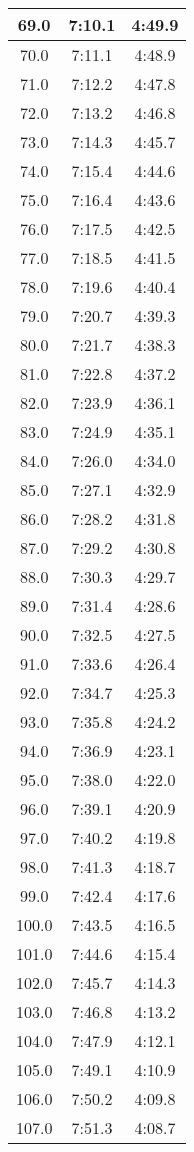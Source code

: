 \begin{footnotesize}
\begin{minipage}{0.25\textwidth}
\begin{tabular}[t]{c|c|c}
	69.0&7:10.1&4:49.9\\\hline
	70.0&7:11.1&4:48.9\\\hline
	71.0&7:12.2&4:47.8\\\hline
	72.0&7:13.2&4:46.8\\\hline
	73.0&7:14.3&4:45.7\\\hline
	74.0&7:15.4&4:44.6\\\hline
	75.0&7:16.4&4:43.6\\\hline
	76.0&7:17.5&4:42.5\\\hline
	77.0&7:18.5&4:41.5\\\hline
	78.0&7:19.6&4:40.4\\\hline
	79.0&7:20.7&4:39.3\\\hline
	80.0&7:21.7&4:38.3\\\hline
	81.0&7:22.8&4:37.2\\\hline
	82.0&7:23.9&4:36.1\\\hline
	83.0&7:24.9&4:35.1\\\hline
	84.0&7:26.0&4:34.0\\\hline
	85.0&7:27.1&4:32.9\\\hline
	86.0&7:28.2&4:31.8\\\hline
	87.0&7:29.2&4:30.8\\\hline
	88.0&7:30.3&4:29.7\\\hline
	89.0&7:31.4&4:28.6\\\hline
	90.0&7:32.5&4:27.5\\\hline
	91.0&7:33.6&4:26.4\\\hline
	92.0&7:34.7&4:25.3\\\hline
	93.0&7:35.8&4:24.2\\\hline
	94.0&7:36.9&4:23.1\\\hline
	95.0&7:38.0&4:22.0\\\hline
	96.0&7:39.1&4:20.9\\\hline
	97.0&7:40.2&4:19.8\\\hline
	98.0&7:41.3&4:18.7\\\hline
	99.0&7:42.4&4:17.6\\\hline
	100.0&7:43.5&4:16.5\\\hline
	101.0&7:44.6&4:15.4\\\hline
	102.0&7:45.7&4:14.3\\\hline
	103.0&7:46.8&4:13.2\\\hline
	104.0&7:47.9&4:12.1\\\hline
	105.0&7:49.1&4:10.9\\\hline
	106.0&7:50.2&4:09.8\\\hline
	107.0&7:51.3&4:08.7\\\hline

\end{tabular}
\end{minipage}
\end{footnotesize}

